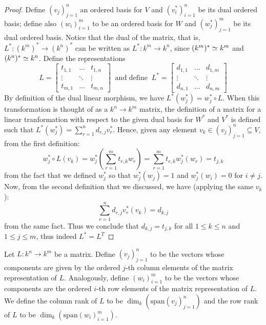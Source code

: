 \begin{proof}
  Define \((v_j)_{j=1}^n\) an ordered basis for \(V\) and \((v_i^\ast)_{i=1}^n\)
  be its dual ordered basis; define also \((w_i)_{i=1}^m\) to be an ordered
  basis for \(W\) and \((w_j^\ast)_{j=1}^m\) be its dual ordered basis. Notice
  that the dual of the matrix, that is, \(L^\ast : (k^m)^\ast \to (k^n)^\ast\)
  can be written as \(L^\ast : k^m \to k^n\), since \((k^m)^\ast \simeq k^m\) and
  \((k^n)^\ast \simeq k^n\). Define the representations
  \[
    L = 
    \begin{bmatrix} 
      t_{1, 1} & \dots   & t_{1, n} \\
      \vdots   & \ddots  & \vdots   \\
      t_{m, 1} & \dots   & t_{m, n}
    \end{bmatrix}
    \ \text{ and define }\
    L^\ast =
    \begin{bmatrix} 
      d_{1, 1} & \dots   & d_{1, m} \\
      \vdots   & \ddots  & \vdots   \\
      d_{n, 1} & \dots   & d_{n, m}
    \end{bmatrix}
  \] 
  By definition of the dual linear morphism, we have \(L^\ast(w_j^\ast) =
  w_j^\ast \circ L\). When this transformation is thought of as a \(k^n \to
  k^m\) matrix, the definition of a matrix for a linear tranformation with
  respect to the given dual basis for \(W^\ast\) and \(V^\ast\) is defined such
  that \(L^\ast(w_j^\ast) = \sum_{r = 1}^n d_{r, j} v_r^\ast\). Hence, given any
  element \(v_k \in (v_j)_{j=1}^n \subseteq V\), from the first definition:
  \begin{equation}
    w_j^\ast \circ L (v_k) 
    = w_j^\ast \left( \sum_{r=1}^m t_{r, k} w_r \right)
    = \sum_{r=1}^m t_{r, k} w_j^\ast(w_r)
    = t_{j, k}
  \end{equation}
  from the fact that we defined \(w_j^\ast\) so that \(w_j^\ast(w_j) = 1\) and
  \(w_j^\ast(w_i) = 0\) for \(i \neq j\). Now, from the second definition that
  we discussed, we have (applying the same \(v_k\)):
  \begin{equation}
    \sum_{r=1}^n d_{r,j} v_r^\ast(v_k)
    = d_{k, j}
  \end{equation}
  from the same fact. Thus we conclude that \(d_{k,j} = t_{j,k}\) for all \(1
  \leq k \leq n\) and \(1 \leq j \leq m\), thus indeed \(L^\ast = L^T\)
\end{proof}

\begin{definition}\label{def: column and row rank}
  Let \(L: k^n \to k^m\) be a matrix. Define \((v_j)_{j=1}^n\) to be the vectors
  whose components are given by the ordered \(j\)-th column elements of the
  matrix representation of \(L\). Analogously, define \((w_i)_{i=1}^m\) to be
  the vectors whose components are the ordered \(i\)-th row elements of the
  matrix representation of \(L\). We define the column rank of \(L\) to be
  \(\dim_k(\mathrm{span}(v_j)_{j=1}^n)\) and the row rank of \(L\) to be
  \(\dim_k(\mathrm{span}(w_i)_{i=1}^m)\).
\end{definition}

